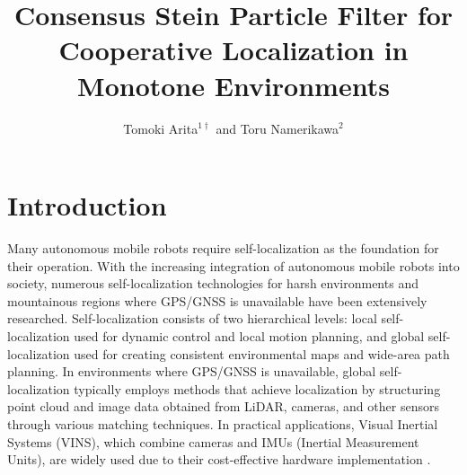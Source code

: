 \documentclass[a4paper,fleqn,10pt,twocolumn]{SICE_ISCS}
\title{Consensus Stein Particle Filter for Cooperative Localization in Monotone Environments}
\author{Tomoki Arita${}^{1\dagger}$ and Toru Namerikawa${}^{2}$}
\begin{document}
\maketitle


\section{Introduction}

Many autonomous mobile robots require self-localization as the foundation for their operation. With the increasing integration of autonomous mobile robots into society, numerous self-localization technologies for harsh environments and mountainous regions where GPS/GNSS is unavailable have been extensively researched. Self-localization consists of two hierarchical levels: local self-localization used for dynamic control and local motion planning, and global self-localization used for creating consistent environmental maps and wide-area path planning. In environments where GPS/GNSS is unavailable, global self-localization typically employs methods that achieve localization by structuring point cloud and image data obtained from LiDAR, cameras, and other sensors through various matching techniques. In practical applications, Visual Inertial Systems (VINS), which combine cameras and IMUs (Inertial Measurement Units), are widely used due to their cost-effective hardware implementation \cite{Qin2018}.
\end{document}
